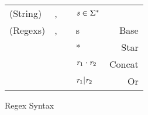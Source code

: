 \begin{figure}
\centering
\begin{tabular}{l@{\ }l@{\ }c@{\ }l@{\ }r}

(String)& \String{},\StringAlt{} & \GEq{} & $\mathit{s}\in\Sigma^*$ \\
(Regexs)& \Regex{},\RegexAlt{} & \GEq{} & s & Base \\
& & & \GBar{} \Regex{}* & Star \\
& & & \GBar{} $\mathit{r}_1\cdot\mathit{r}_2$ & Concat \\
& & & \GBar{} $\mathit{r}_1 | \mathit{r}_2$ & Or \\
\end{tabular}
\caption{Regex Syntax}
\label{fig:regex-syntax}
\end{figure}
